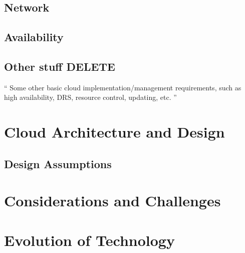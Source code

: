 \documentclass[]{article}
\begin{document}
\subsection{Network}

\subsection{Availability}

\subsection{Other stuff DELETE}
`` Some other basic cloud implementation/management requirements, such as high availability, DRS,
resource control, updating, etc. ''

\section{Cloud Architecture and Design}

\subsection{Design Assumptions}

\section{Considerations and Challenges}

\section{Evolution of Technology}
\end{document}
